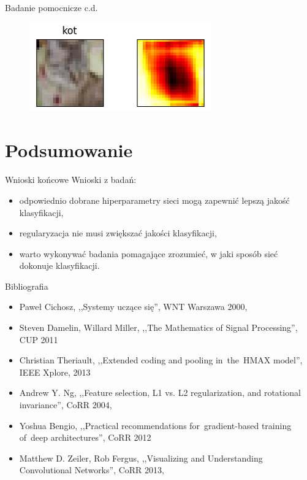 \documentclass[xcolor=dvipsnames]{beamer}
\begin{document}
\begin{frame}{Badanie pomocnicze c.d.}
  \begin{figure}
    \includegraphics[width=\textwidth]{img/heatmap_4.png}
  \end{figure}
\end{frame}

\section{Podsumowanie}
\begin{frame}{Wnioski końcowe}
  Wnioski z badań:
  \begin{itemize}
    \item odpowiednio dobrane hiperparametry sieci mogą zapewnić lepszą jakość klasyfikacji,
    \item regularyzacja nie musi zwiększać jakości klasyfikacji,
    \item warto wykonywać badania pomagające zrozumieć, w jaki sposób sieć dokonuje klasyfikacji.
  \end{itemize}
\end{frame}
\begin{frame}{Bibliografia}
	\begin{itemize}
		\item Paweł Cichosz, ,,Systemy uczące się'', WNT Warszawa 2000,
		\item Steven Damelin, Willard Miller, ,,The Mathematics of Signal Processing'', CUP 2011
		\item Christian Theriault, ,,Extended coding and pooling in~the~HMAX model'', IEEE Xplore, 2013
		\item Andrew Y. Ng, ,,Feature selection, L1 vs. L2 regularization, and rotational invariance'', CoRR 2004,
		\item Yoshua Bengio, ,,Practical recommendations for~gradient-based training of~deep architectures'', CoRR 2012
		\item Matthew D. Zeiler, Rob Fergus, ,,Visualizing and Understanding Convolutional Networks'', CoRR 2013,
	\end{itemize}
\end{frame}
\end{document}
